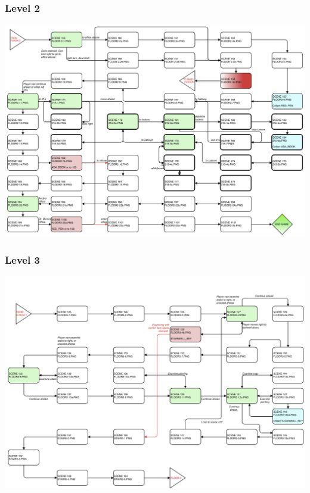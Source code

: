 \documentclass{article}
\begin{document}
		\subsubsection{Level 2}
			\begin{center}
				\includegraphics[scale=0.6, angle=90]{LevelProg2.png}
			\end{center}
		\subsubsection{Level 3}
			\begin{center}
				\includegraphics[scale=0.6, angle=90]{LevelProg3.png}
			\end{center}
\end{document}
